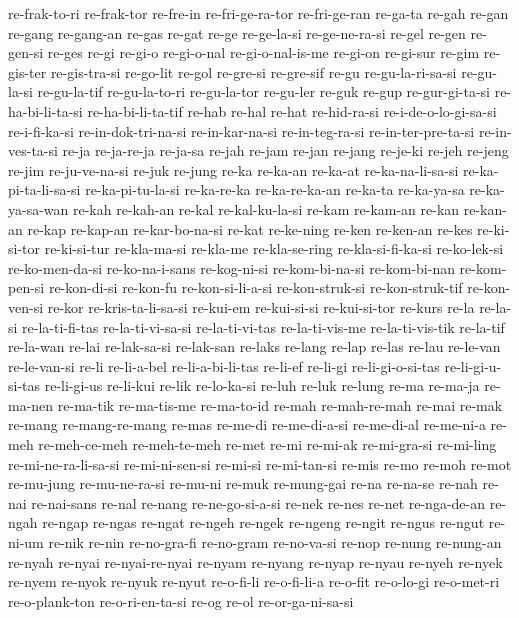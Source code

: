 {re-frak-to-ri re-frak-tor re-fre-in re-fri-ge-ra-tor re-fri-ge-ran
re-ga-ta re-gah re-gan re-gang re-gang-an re-gas re-gat re-ge re-ge-la-si
re-ge-ne-ra-si re-gel re-gen re-gen-si re-ges re-gi re-gi-o re-gi-o-nal
re-gi-o-nal-is-me re-gi-on re-gi-sur re-gim re-gis-ter re-gis-tra-si
re-go-lit re-gol re-gre-si re-gre-sif re-gu re-gu-la-ri-sa-si re-gu-la-si
re-gu-la-tif re-gu-la-to-ri re-gu-la-tor re-gu-ler re-guk re-gup
re-gur-gi-ta-si re-ha-bi-li-ta-si re-ha-bi-li-ta-tif re-hab re-hal re-hat
re-hid-ra-si re-i-de-o-lo-gi-sa-si re-i-fi-ka-si re-in-dok-tri-na-si
re-in-kar-na-si re-in-teg-ra-si re-in-ter-pre-ta-si re-in-ves-ta-si re-ja
re-ja-re-ja re-ja-sa re-jah re-jam re-jan re-jang re-je-ki re-jeh re-jeng
re-jim re-ju-ve-na-si re-juk re-jung re-ka re-ka-an re-ka-at
re-ka-na-li-sa-si re-ka-pi-ta-li-sa-si re-ka-pi-tu-la-si re-ka-re-ka
re-ka-re-ka-an re-ka-ta re-ka-ya-sa re-ka-ya-sa-wan re-kah re-kah-an
re-kal re-kal-ku-la-si re-kam re-kam-an re-kan re-kan-an re-kap re-kap-an
re-kar-bo-na-si re-kat re-ke-ning re-ken re-ken-an re-kes re-ki-si-tor
re-ki-si-tur re-kla-ma-si re-kla-me re-kla-se-ring re-kla-si-fi-ka-si
re-ko-lek-si re-ko-men-da-si re-ko-na-i-sans re-kog-ni-si re-kom-bi-na-si
re-kom-bi-nan re-kom-pen-si re-kon-di-si re-kon-fu re-kon-si-li-a-si
re-kon-struk-si re-kon-struk-tif re-kon-ven-si re-kor re-kris-ta-li-sa-si
re-kui-em re-kui-si-si re-kui-si-tor re-kurs re-la re-la-si
re-la-ti-fi-tas re-la-ti-vi-sa-si re-la-ti-vi-tas re-la-ti-vis-me
re-la-ti-vis-tik re-la-tif re-la-wan re-lai re-lak-sa-si re-lak-san
re-laks re-lang re-lap re-las re-lau re-le-van re-le-van-si re-li
re-li-a-bel re-li-a-bi-li-tas re-li-ef re-li-gi re-li-gi-o-si-tas
re-li-gi-u-si-tas re-li-gi-us re-li-kui re-lik re-lo-ka-si re-luh re-luk
re-lung re-ma re-ma-ja re-ma-nen re-ma-tik re-ma-tis-me re-ma-to-id re-mah
re-mah-re-mah re-mai re-mak re-mang re-mang-re-mang re-mas re-me-di
re-me-di-a-si re-me-di-al re-me-ni-a re-meh re-meh-ce-meh re-meh-te-meh
re-met re-mi re-mi-ak re-mi-gra-si re-mi-ling re-mi-ne-ra-li-sa-si
re-mi-ni-sen-si re-mi-si re-mi-tan-si re-mis re-mo re-moh re-mot
re-mu-jung re-mu-ne-ra-si re-mu-ni re-muk re-mung-gai re-na re-na-se
re-nah re-nai re-nai-sans re-nal re-nang re-ne-go-si-a-si re-nek re-nes
re-net re-nga-de-an re-ngah re-ngap re-ngas re-ngat re-ngeh re-ngek
re-ngeng re-ngit re-ngus re-ngut re-ni-um re-nik re-nin re-no-gra-fi
re-no-gram re-no-va-si re-nop re-nung re-nung-an re-nyah re-nyai
re-nyai-re-nyai re-nyam re-nyang re-nyap re-nyau re-nyeh re-nyek re-nyem
re-nyok re-nyuk re-nyut re-o-fi-li re-o-fi-li-a re-o-fit re-o-lo-gi
re-o-met-ri re-o-plank-ton re-o-ri-en-ta-si re-og re-ol re-or-ga-ni-sa-si
}
